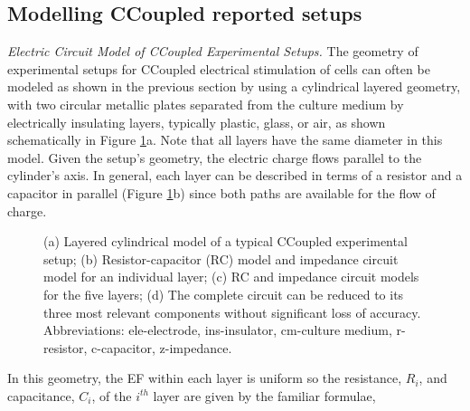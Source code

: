 \subsection{Modelling \acs{CCoupled} reported setups}


\noindent \textit{Electric Circuit Model of \acs{CCoupled} Experimental Setups.} The geometry of experimental setups for \acs{CCoupled} electrical stimulation of cells can often be modeled as shown in the previous section by using a cylindrical layered geometry, with two circular metallic plates separated from the culture medium by electrically insulating layers, typically plastic, glass, or air, as shown schematically in Figure \ref{fig5d3}a. Note that all layers have the same diameter in this model. Given the setup's geometry, the electric charge flows parallel to the cylinder's axis.  In general, each layer can be described in terms of a resistor and a capacitor in parallel (Figure \ref{fig5d3}b) since both paths are available for the flow of charge.


\begin{figure}
\caption{(a) Layered cylindrical model of a typical \acs{CCoupled} experimental setup; (b) Resistor-capacitor (RC) model and impedance circuit model for an individual layer; (c) RC and impedance circuit models for the five layers; (d) The complete circuit can be reduced to its three most relevant components without significant loss of accuracy. Abbreviations: ele-electrode, ins-insulator, cm-culture medium, r-resistor, c-capacitor, z-impedance.}
\label{fig5d3}
\end{figure}

In this geometry, the \acs{EF} within each layer is uniform so the resistance, $R_i$, and capacitance, $C_i$, of the $i^{th}$ layer are given by the familiar formulae,


